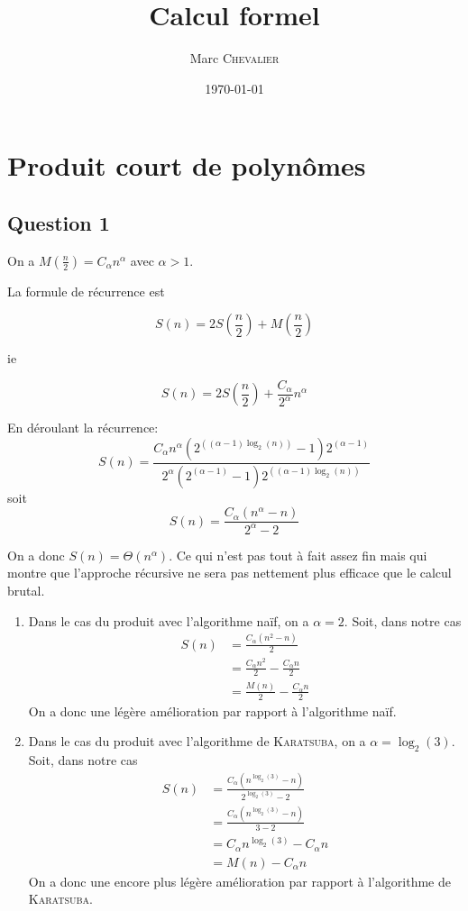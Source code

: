 

\title{Calcul formel}
\author{
    Marc \textsc{Chevalier}
}
\date{\today}


\maketitle

\section*{Produit court de polynômes}

\subsection*{Question 1}

On a $M\left(\frac{n}{2}\right) = C_\alpha n^\alpha$ avec $\alpha>1$.

La formule de récurrence est 

\[
    S(n) = 2S\left(\frac{n}{2}\right) + M\left(\frac{n}{2}\right)
\]

ie 

\[
    S(n) = 2S\left(\frac{n}{2}\right) + \frac{C_\alpha}{2^\alpha}n^\alpha
\]

En déroulant la récurrence:
\[
    S(n)=\frac{C_\alpha n^\alpha(2^{((\alpha-1)\log_2(n))}-1)2^{(\alpha-1)}}{2^\alpha(2^{(\alpha-1)}-1)2^{((\alpha-1)\log_2(n))}}
\]
soit
\[
    S(n) = \frac{C_\alpha(n^\alpha-n)}{2^\alpha-2}
\]

On a donc $S(n) = \Theta(n^\alpha)$. Ce qui n'est pas tout à fait assez fin mais qui montre que l'approche récursive ne sera pas nettement plus efficace que le calcul brutal.

\begin{enumerate}
    \item Dans le cas du produit avec l'algorithme naïf, on a $\alpha = 2$. Soit, dans notre cas
\[
    \begin{aligned}
        S(n) &= \frac{C_\alpha(n^2-n)}{2}\\
        &= \frac{C_\alpha n^2}{2} - \frac{C_\alpha n}{2}\\
        &= \frac{M(n)}{2} - \frac{C_\alpha n}{2}
    \end{aligned}
\]
    On a donc une légère amélioration par rapport à l'algorithme naïf.
    
    \item Dans le cas du produit avec l'algorithme de \textsc{Karatsuba}, on a $\alpha = \log_2(3)$. Soit, dans notre cas
\[
    \begin{aligned}
        S(n) &= \frac{C_\alpha(n^{\log_2(3)}-n)}{2^{\log_2(3)}-2}\\
        &= \frac{C_\alpha(n^{\log_2(3)}-n)}{3-2}\\
        &= C_\alpha n^{\log_2(3)}-C_\alpha n\\
        &= M(n) -C_\alpha n
    \end{aligned}
\]
    On a donc une encore plus légère amélioration par rapport à l'algorithme de \textsc{Karatsuba}.
\end{enumerate}


